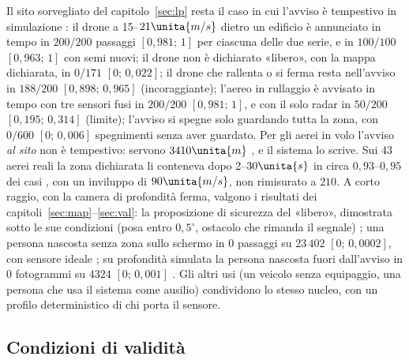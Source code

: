 Il sito sorvegliato del capitolo~\ref{sec:lp} resta il caso in cui l'avviso è tempestivo in simulazione : il drone a 15--$21\unita{m/s}$ dietro un edificio è annunciato in tempo in $200/200$ passaggi $[0{,}981;\,1]$ per ciascuna delle due serie, e in $100/100$ $[0{,}963;\,1]$ con semi nuovi; il drone non è dichiarato «libero», con la mappa dichiarata, in $0/171$ $[0;\,0{,}022]$; il drone che rallenta o si ferma resta nell'avviso in $188/200$ $[0{,}898;\,0{,}965]$ (incoraggiante); l'aereo in rullaggio è avvisato in tempo con tre sensori fusi in $200/200$ $[0{,}981;\,1]$, e con il solo radar in $50/200$ $[0{,}195;\,0{,}314]$ (limite); l'avviso si spegne solo guardando tutta la zona, con $0/600$ $[0;\,0{,}006]$ spegnimenti senza aver guardato. Per gli aerei in volo l'avviso \emph{al sito} non è tempestivo: servono $3410\unita{m}$ , e il sistema lo scrive. Sui 43 aerei reali la zona dichiarata li conteneva dopo 2--$30\unita{s}$ in circa $0{,}93$--$0{,}95$ dei casi , con un inviluppo di $90\unita{m/s}$, non rimisurato a $210$. A corto raggio, con la camera di profondità ferma, valgono i risultati dei capitoli~\ref{sec:map}--\ref{sec:val}: la proposizione di sicurezza del «libero», dimostrata sotto le sue condizioni (posa entro $0{,}5^\circ$, ostacolo che rimanda il segnale) ; una persona nascosta senza zona sullo schermo in $0$ passaggi su $23\,402$ $[0;\,0{,}0002]$, con sensore ideale ; su profondità simulata la persona nascosta fuori dall'avviso in $0$ fotogrammi su $4324$ $[0;\,0{,}001]$ . Gli altri usi (un veicolo senza equipaggio, una persona che usa il sistema come ausilio) condividono lo stesso nucleo, con un profilo deterministico di chi porta il sensore.

\subsection{Condizioni di validità}\label{sec:vo-validita}

